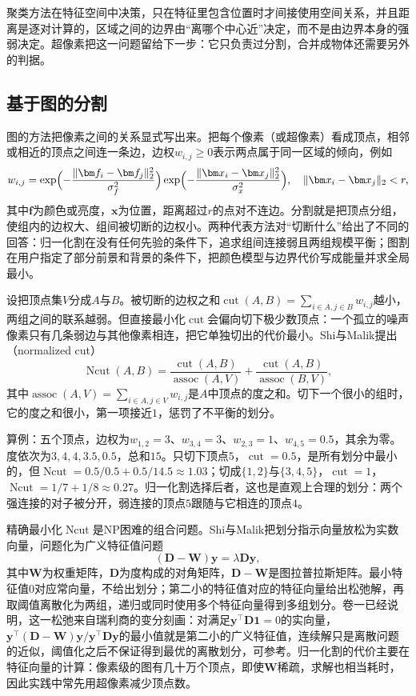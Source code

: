聚类方法在特征空间中决策，只在特征里包含位置时才间接使用空间关系，并且距离是逐对计算的，区域之间的边界由“离哪个中心近”决定，而不是由边界本身的强弱决定。超像素把这一问题留给下一步：它只负责过分割，合并成物体还需要另外的判据。

\subsection{基于图的分割}
\label{sec:vision-features-graph-segmentation}

图的方法把像素之间的关系显式写出来。把每个像素（或超像素）看成顶点，相邻或相近的顶点之间连一条边，边权$w_{i,j}\geq0$表示两点属于同一区域的倾向，例如
\[
  w_{i,j}=\exp\Bigl(-\frac{\lVert\bm f_i-\bm f_j\rVert_2^2}{\sigma_f^2}\Bigr)\exp\Bigl(-\frac{\lVert\bm x_i-\bm x_j\rVert_2^2}{\sigma_x^2}\Bigr),\quad \lVert\bm x_i-\bm x_j\rVert_2<r,
\]
其中$\bm f$为颜色或亮度，$\bm x$为位置，距离超过$r$的点对不连边。分割就是把顶点分组，使组内的边权大、组间被切断的边权小。两种代表方法对“切断什么”给出了不同的回答：归一化割在没有任何先验的条件下，追求组间连接弱且两组规模平衡；图割在用户指定了部分前景和背景的条件下，把颜色模型与边界代价写成能量并求全局最小。

设把顶点集$V$分成$A$与$B$。被切断的边权之和$\operatorname{cut}(A,B)=\sum_{i\in A,j\in B}w_{i,j}$越小，两组之间的联系越弱。但直接最小化$\operatorname{cut}$会偏向切下极少数顶点：一个孤立的噪声像素只有几条弱边与其他像素相连，把它单独切出的代价最小。Shi与Malik提出（normalized cut）
\begin{equation}
  \operatorname{Ncut}(A,B)=\frac{\operatorname{cut}(A,B)}{\operatorname{assoc}(A,V)}+\frac{\operatorname{cut}(A,B)}{\operatorname{assoc}(B,V)},
  \label{eq:vision-features-ncut}
\end{equation}
其中$\operatorname{assoc}(A,V)=\sum_{i\in A,j\in V}w_{i,j}$是$A$中顶点的度之和。切下一个很小的组时，它的度之和很小，第一项接近$1$，惩罚了不平衡的划分。

算例：五个顶点，边权为$w_{1,2}=3$、$w_{3,4}=3$、$w_{2,3}=1$、$w_{4,5}=0.5$，其余为零。度依次为$3,4,4,3.5,0.5$，总和$15$。只切下顶点$5$，$\operatorname{cut}=0.5$，是所有划分中最小的，但$\operatorname{Ncut}=0.5/0.5+0.5/14.5\approx1.03$；切成$\{1,2\}$与$\{3,4,5\}$，$\operatorname{cut}=1$，$\operatorname{Ncut}=1/7+1/8\approx0.27$。归一化割选择后者，这也是直观上合理的划分：两个强连接的对子被分开，弱连接的顶点$5$跟随与它相连的顶点$4$。

精确最小化$\operatorname{Ncut}$是NP困难的组合问题。Shi与Malik把划分指示向量放松为实数向量，问题化为广义特征值问题
\[
  (\bm D-\bm W)\bm y=\lambda\bm D\bm y,
\]
其中$\bm W$为权重矩阵，$\bm D$为度构成的对角矩阵，$\bm D-\bm W$是图拉普拉斯矩阵。最小特征值$0$对应常向量，不给出划分；第二小的特征值对应的特征向量给出松弛解，再取阈值离散化为两组，递归或同时使用多个特征向量得到多组划分。卷一已经说明，这一松弛来自瑞利商的变分刻画：对满足$\bm y^{\top}\bm D\bm1=0$的实向量，$\bm y^{\top}(\bm D-\bm W)\bm y/\bm y^{\top}\bm D\bm y$的最小值就是第二小的广义特征值，连续解只是离散问题的近似，阈值化之后不保证得到最优的离散划分，可参考。归一化割的代价主要在特征向量的计算：像素级的图有几十万个顶点，即使$\bm W$稀疏，求解也相当耗时，因此实践中常先用超像素减少顶点数。

